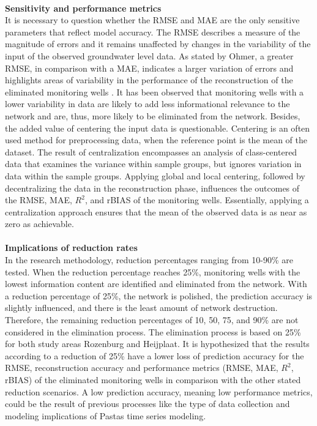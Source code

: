 \\
\textbf{Sensitivity and performance metrics}\\
It is necessary to question whether the RMSE and MAE are the only sensitive parameters that reflect model accuracy. The RMSE describes a measure of the magnitude of errors and it remains unaffected by changes in the variability of the input of the observed groundwater level data. As stated by Ohmer, a greater RMSE, in comparison with a MAE, indicates a larger variation of errors and highlights areas of variability in the performance of the reconstruction of the eliminated monitoring wells \cite{ohmer-2019}. It has been observed that monitoring wells with a lower variability in data are likely to add less informational relevance to the network and are, thus, more likely to be eliminated from the network. Besides, the added value of centering the input data is questionable. Centering is an often used method for preprocessing data, when the reference point is the mean of the dataset. The result of centralization encompasses an analysis of class-centered data that examines the variance within sample groups, but ignores variation in data within the sample groups. Applying global and local centering, followed by decentralizing the data in the reconstruction phase, influences the outcomes of the RMSE, MAE, $R^2$, and rBIAS of the monitoring wells. Essentially, applying a centralization approach ensures that the mean of the observed data is as near as zero as achievable. \\
\\
\textbf{Implications of reduction rates}\\
In the research methodology, reduction percentages ranging from 10-90\% are tested. When the reduction percentage reaches 25\%, monitoring wells with the lowest information content are identified and eliminated from the network. With a reduction percentage of 25\%, the network is polished, the prediction accuracy is slightly influenced, and there is the least amount of network destruction. Therefore, the remaining reduction percentages of 10, 50, 75, and 90\% are not considered in the elimination process. The elimination process is based on 25\% for both study areas Rozenburg and Heijplaat. It is hypothesized that the results according to a reduction of 25\% have a lower loss of prediction accuracy for the RMSE, reconstruction accuracy and performance metrics (RMSE, MAE, $R^2$, rBIAS) of the eliminated monitoring wells in comparison with the other stated reduction scenarios. A low prediction accuracy, meaning low performance metrics, could be the result of previous processes like the type of data collection and modeling implications of Pastas time series modeling.\\
